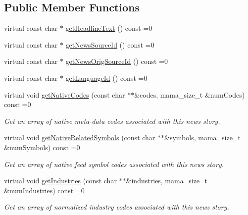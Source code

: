 \subsection*{Public Member Functions}
\begin{CompactItemize}
\item 
virtual const char $\ast$ \hyperlink{classWombat_1_1MamdaNewsMetaData_c80a30c0b95497091c32972658ab4340}{get\-Headline\-Text} () const =0
\item 
virtual const char $\ast$ \hyperlink{classWombat_1_1MamdaNewsMetaData_bc4fae00154c4b27324e1da1d25585ce}{get\-News\-Source\-Id} () const =0
\item 
virtual const char $\ast$ \hyperlink{classWombat_1_1MamdaNewsMetaData_5fe17063b6df522e76b7016884f964d1}{get\-News\-Orig\-Source\-Id} () const =0
\item 
virtual const char $\ast$ \hyperlink{classWombat_1_1MamdaNewsMetaData_213a4b9676abf7cf91a311a599edc2d3}{get\-Language\-Id} () const =0
\item 
virtual void \hyperlink{classWombat_1_1MamdaNewsMetaData_2eee46712fbf04831baf811695678aeb}{get\-Native\-Codes} (const char $\ast$$\ast$\&codes, mama\_\-size\_\-t \&num\-Codes) const =0
\begin{CompactList}\small\item\em Get an array of native meta-data codes associated with this news story. \item\end{CompactList}\item 
virtual void \hyperlink{classWombat_1_1MamdaNewsMetaData_64e79bec2fd98b5669ea62bb9c51fec2}{get\-Native\-Related\-Symbols} (const char $\ast$$\ast$\&symbols, mama\_\-size\_\-t \&num\-Symbols) const =0
\begin{CompactList}\small\item\em Get an array of native feed symbol codes associated with this news story. \item\end{CompactList}\item 
virtual void \hyperlink{classWombat_1_1MamdaNewsMetaData_dd73f4b456cf4c7720d3ba86e4d71a4c}{get\-Industries} (const char $\ast$$\ast$\&industries, mama\_\-size\_\-t \&num\-Industries) const =0
\begin{CompactList}\small\item\em Get an array of normalized industry codes associated with this news story. \item\end{CompactList}\item 
$$
\end{CompactItemize}
